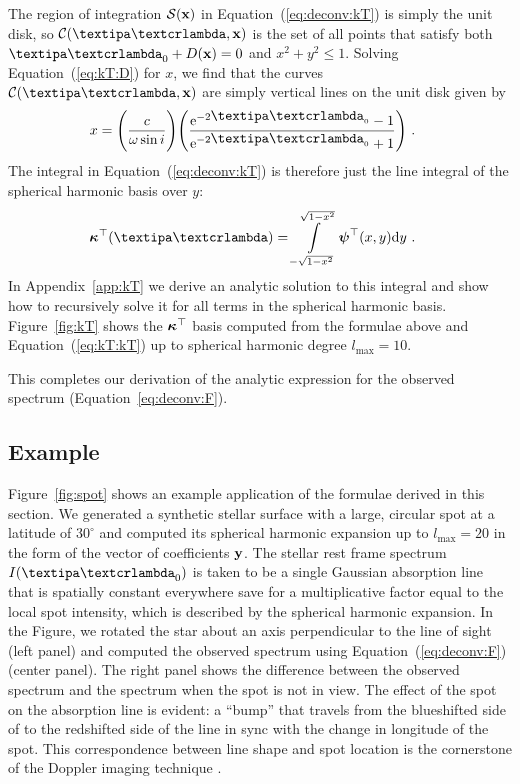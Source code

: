 \documentclass[modern]{aastex631}
\begin{document}
The region of integration $\mathcal{S}({\mathbf{x}})$ in Equation~(\ref{eq:deconv:kT}) is simply the unit disk, so $\Curve(\lnlam, \x)$ is the set of all points that satisfy both $\lnlam_0 + \D(\x) = 0$ and $x^2 + y^2 \le 1$.
Solving Equation~(\ref{eq:kT:D}) for $x$, we find that the curves $\Curve(\lnlam, \x)$ are simply vertical lines on the unit disk given by
%
\begin{align}
    x & =
    \Bigg(\frac{c}{\omega\sin i}\Bigg)
    \Bigg(\frac{\mathrm{e}^{-2{\lnlam_0}} - 1}
    {\mathrm{e}^{-2{\lnlam_0}} + 1}\Bigg)
    \quad .
\end{align}
%
The integral in Equation~(\ref{eq:deconv:kT}) is therefore just the line integral of the spherical harmonic basis over $y$:
%
\begin{align}
    \label{eq:kT:kT}
    \kT(\lnlam)
     & =
    \int\limits_{-\sqrt{1 - x^2}}^
    {\sqrt{1 - x^2}}
    \ylmbasis
    (x, y)
    \mathrm{d}y
    \quad .
\end{align}
%
In Appendix~\ref{app:kT} we derive an analytic solution to this integral and show how to recursively solve it for all terms in the spherical harmonic basis.
Figure~\ref{fig:kT} shows the $\boldsymbol{\kappa}^\top$ basis computed from the formulae above and Equation~(\ref{eq:kT:kT}) up to spherical harmonic degree $l_\mathrm{max}=10$.

This completes our derivation of the analytic expression for the observed spectrum (Equation~\ref{eq:deconv:F}).

\subsection{Example}
%
Figure~\ref{fig:spot} shows an example application of the formulae derived in this section. 
We generated a synthetic stellar surface with a large, circular spot at a latitude of $30^\circ$ and computed its spherical harmonic expansion up to $l_\mathrm{max}=20$ in the form of the vector of coefficients ${\mathbf{y}}$.
The stellar rest frame spectrum $I(\lnlam_0)$ is taken to be a single Gaussian absorption line that is spatially constant everywhere save for a multiplicative factor equal to the local spot intensity, which is described by the spherical harmonic expansion.
In the Figure, we rotated the star about an axis perpendicular to the line of sight (left panel) and computed the observed spectrum using Equation~(\ref{eq:deconv:F}) (center panel). 
The right panel shows the difference between the observed spectrum and the spectrum when the spot is not in view.
The effect of the spot on the absorption line is evident: a ``bump'' that travels from the blueshifted side of to the redshifted side of the line in sync with the change in longitude of the spot. 
This correspondence between line shape and spot location is the cornerstone of the Doppler imaging technique \citep[compare to, e.g., Figures 1 and 4 in][]{Vogt1983}.
\end{document}
